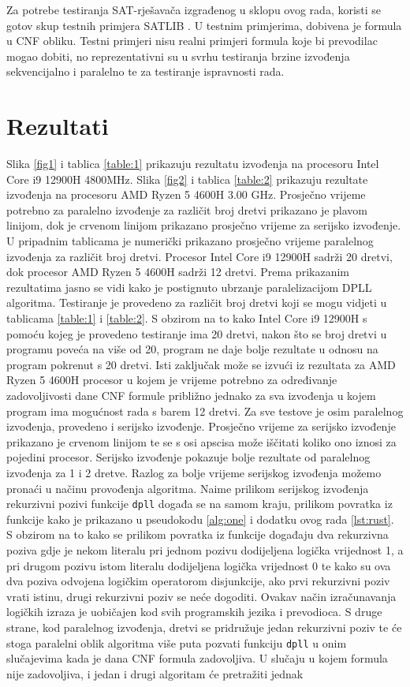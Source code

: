 \documentclass[conference]{IEEEtran}
\begin{document}
Za potrebe testiranja SAT-rješavača izgrađenog u sklopu ovog rada, koristi se gotov skup testnih primjera SATLIB \cite{b5}. U testnim primjerima, dobivena je formula u CNF obliku. Testni primjeri nisu realni primjeri formula koje bi prevodilac mogao dobiti, no reprezentativni su u svrhu testiranja brzine izvođenja sekvencijalno i paralelno te za testiranje ispravnosti rada.

\section{Rezultati}

Slika \ref{fig1} i tablica \ref{table:1} prikazuju rezultatu izvođenja na procesoru Intel Core i9 12900H 4800MHz. Slika \ref{fig2} i tablica \ref{table:2} prikazuju rezultate izvođenja na procesoru AMD Ryzen 5 4600H 3.00 GHz. Prosječno vrijeme potrebno za paralelno izvođenje za različit broj dretvi prikazano je plavom linijom, dok je crvenom linijom prikazano prosječno vrijeme za serijsko izvođenje. U pripadnim tablicama je numerički prikazano prosječno vrijeme paralelnog izvođenja za različit broj dretvi. Procesor Intel Core i9 12900H sadrži 20 dretvi, dok procesor AMD Ryzen 5 4600H sadrži 12 dretvi. Prema prikazanim rezultatima jasno se vidi kako je postignuto ubrzanje paralelizacijom DPLL algoritma. Testiranje je provedeno za različit broj dretvi koji se mogu vidjeti u tablicama \ref{table:1} i \ref{table:2}. S obzirom na to kako Intel Core i9 12900H s pomoću kojeg je provedeno testiranje ima 20 dretvi, nakon što se broj dretvi u programu poveća na više od 20, program ne daje bolje rezultate u odnosu na program pokrenut s 20 dretvi. Isti zaključak može se izvući iz rezultata za AMD Ryzen 5 4600H procesor u kojem je vrijeme potrebno za određivanje zadovoljivosti dane CNF formule približno jednako za sva izvođenja u kojem program ima mogućnost rada s barem 12 dretvi. Za sve testove je osim paralelnog izvođenja, provedeno i serijsko izvođenje. Prosječno vrijeme za serijsko izvođenje prikazano je crvenom linijom te se s osi apscisa može iščitati koliko ono iznosi za pojedini procesor. Serijsko izvođenje pokazuje bolje rezultate od paralelnog izvođenja za 1 i 2 dretve. Razlog za bolje vrijeme serijskog izvođenja možemo pronaći u načinu provođenja algoritma. Naime prilikom serijskog izvođenja rekurzivni pozivi funkcije \texttt{dpll} događa se na samom kraju, prilikom povratka iz funkcije kako je prikazano u pseudokodu \ref{alg:one} i dodatku ovog rada \ref{lst:rust}. S obzirom na to kako se prilikom povratka iz funkcije događaju dva rekurzivna poziva gdje je nekom literalu pri jednom pozivu dodijeljena logička vrijednost 1, a pri drugom pozivu istom literalu dodijeljena logička vrijednost 0 te kako su ova dva poziva odvojena logičkim operatorom disjunkcije, ako prvi rekurzivni poziv vrati istinu, drugi rekurzivni poziv se neće dogoditi. Ovakav način izračunavanja logičkih izraza je uobičajen kod svih programskih jezika i prevodioca. S druge strane, kod paralelnog izvođenja, dretvi se pridružuje jedan rekurzivni poziv te će stoga paralelni oblik algoritma više puta pozvati funkciju \texttt{dpll} u onim slučajevima kada je dana CNF formula zadovoljiva. U slučaju u kojem formula nije zadovoljiva, i jedan i drugi algoritam će pretražiti jednak 
\end{document}
